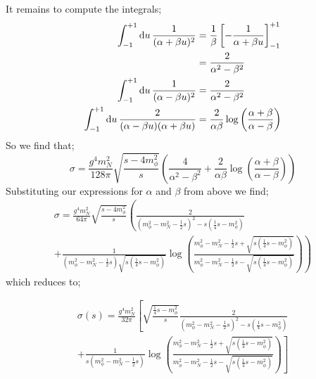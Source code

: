 \documentclass[10pt]{article}
\begin{document}
It remains to compute the integrals;
\begin{align*}
\int_{-1}^{+1}{\text{d}u \,\frac{1}{(\alpha + \beta u)^2}} &= \frac{1}{\beta}\left[-\frac{1}{\alpha + \beta u}\right]_{-1}^{+1} \\
&= \frac{2}{\alpha^2 - \beta^2} \\
\int_{-1}^{+1}{\text{d}u \,\frac{1}{(\alpha - \beta u)^2}} &=  \frac{2}{\alpha^2 - \beta^2} \\
\int_{-1}^{+1}{\text{d}u \,\frac{2}{(\alpha - \beta u)(\alpha + \beta u)}} &= \frac{2}{\alpha \beta}\log\left(\frac{\alpha + \beta}{\alpha - \beta}\right)
\end{align*}
So we find that;
\begin{equation*}
\sigma = \frac{g^4 m_N^2}{128 \pi}\sqrt{\frac{s - 4m_\phi^2}{s}}\left(\frac{4}{\alpha^2 - \beta^2} + \frac{2}{\alpha \beta}\log\left(\frac{\alpha + \beta}{\alpha - \beta}\right)\right)
\end{equation*}
Substituting our expressions for $\alpha$ and $\beta$ from above we find;
\begin{multline*}
\sigma = \frac{g^4 m_N^2}{64\pi}\sqrt{\frac{s - 4m_\phi^2}{s}}\left( \frac{2}{\left(m_\phi^2 - m_N^2 - \frac{1}{2}s\right)^2 - s\left(\frac{1}{4}s - m_\phi^2\right)} \right. \\ \left. + \frac{1}{\left(m_\phi^2 - m_N^2 - \frac{1}{2}s\right)\sqrt{s\left(\frac{1}{4}s - m_\phi^2\right)}} \log\left(\frac{m_\phi^2 - m_N^2 - \frac{1}{2}s + \sqrt{s\left(\frac{1}{4}s - m_\phi^2\right)}}{m_\phi^2 - m_N^2 - \frac{1}{2}s - \sqrt{s\left(\frac{1}{4}s - m_\phi^2\right)}}\right)\right)
\end{multline*}
which reduces to;
\begin{examplebox1}
\begin{multline}
\label{eq:sigma}
\sigma(s) = \frac{g^4 m_N^2}{32 \pi}\left[\sqrt{\frac{\frac{1}{4}s - m_\phi^2}{s}}\frac{2}{\left(m_\phi^2 - m_N^2 - \frac{1}{2}s\right)^2 - s\left(\frac{1}{4}s - m_\phi^2\right)} \right. \\ \left. + \frac{1}{s\left(m_\phi^2 - m_N^2 - \frac{1}{2}s\right)}\log\left(\frac{m_\phi^2 - m_N^2 - \frac{1}{2}s + \sqrt{s\left(\frac{1}{4}s - m_\phi^2\right)}}{m_\phi^2 - m_N^2 - \frac{1}{2}s - \sqrt{s\left(\frac{1}{4}s - m_\phi^2\right)}}\right)\right]
\end{multline}
\end{examplebox1}
\end{document}
